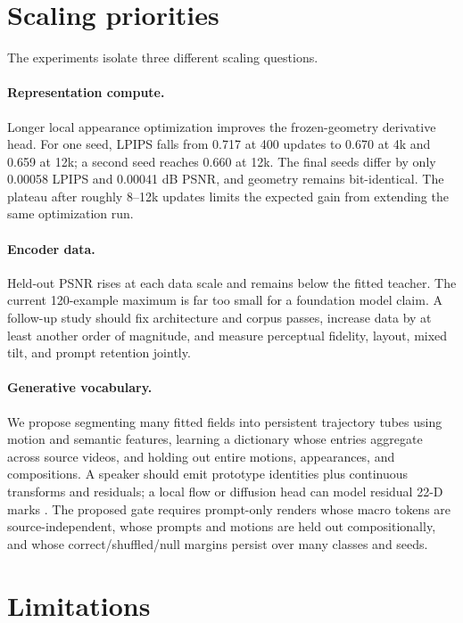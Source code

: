 \documentclass{article}
\begin{document}
\section{Scaling priorities}
\label{sec:scaling}

The experiments isolate three different scaling questions.

\paragraph{Representation compute.}
Longer local appearance optimization improves the frozen-geometry derivative head. For
one seed, LPIPS falls from 0.717 at 400 updates to 0.670 at 4k and 0.659 at 12k; a second seed reaches
0.660 at 12k. The final seeds differ by only 0.00058 LPIPS and 0.00041 dB PSNR, and geometry remains
bit-identical. The plateau after roughly 8--12k updates limits the expected gain from extending the
same optimization run.

\paragraph{Encoder data.}
Held-out PSNR rises at each data scale and remains below the fitted teacher. The current 120-example
maximum is far too small for a foundation model claim. A follow-up study should fix architecture
and corpus passes, increase data by at least another order of magnitude, and measure perceptual
fidelity, layout, mixed tilt, and prompt retention jointly.

\paragraph{Generative vocabulary.}
We propose segmenting many fitted fields into persistent trajectory tubes using motion and semantic
features, learning a dictionary whose
entries aggregate across source videos, and holding out entire motions, appearances, and
compositions. A speaker should emit
prototype identities plus continuous transforms and residuals; a local flow or diffusion head can
model residual 22-D marks \cite{lipman2023flow,ludke2024pointset,hui2025notsoptimal}. The proposed
gate requires prompt-only renders whose macro tokens are source-independent, whose prompts and
motions are held out compositionally, and whose correct/shuffled/null margins persist over many
classes and seeds.

\section{Limitations}
\label{sec:limitations}
\end{document}

